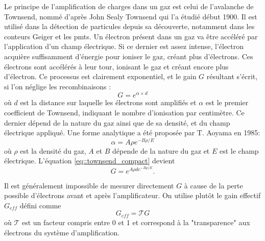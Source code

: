       Le principe de l'amplification de charges dans un gaz est celui de l'avalanche de Townsend, nommé d'après John Sealy Townsend qui l'a étudié début 1900\cite{Townsend1910}. Il est utilisé dans la détection de particules depuis sa découverte, notamment dans les conteurs Geiger et les \glspl{pmt}. Un électron présent dans un gaz va être accéléré par l'application d'un champ électrique. Si ce dernier est assez intense, l'électron acquière suffisamment d'énergie pour ioniser le gaz, créant plus d'électrons. Ces électrons sont accélérés à leur tour, ionisant le gaz et créant encore plus d'électron. Ce processus est clairement exponentiel, et le gain $G$ résultant s'écrit, si l'on néglige les recombinaisons :
      \begin{equation}\label{eq::townsend_compact}
        G = e^{\alpha\times d}
      \end{equation}
      où $d$ est la distance sur laquelle les électrons sont amplifiés et $\alpha$ est le premier coefficient de Townsend, indiquant le nombre d'ionisation par centimètre. Ce dernier dépend de la nature du gaz ainsi que de sa densité, et du champ électrique appliqué. Une forme analytique a été proposée par T. Aoyama en 1985\cite{Aoyama1985}:
      \begin{equation}\label{eq::townsend_coef}
        \alpha = A\rho e^{-B\rho/E}
      \end{equation}
      où $\rho$ est la densité du gaz, $A$ et $B$ dépende de la nature du gaz et $E$ est le champ électrique. L'équation \eqref{eq::townsend_compact} devient
      \begin{equation}\label{eq::townsend}
        G = e^{A\rho  de^{-B\rho /E}}.
      \end{equation}

      Il est généralement impossible de mesurer directement $G$ à cause de la perte possible d'électrons avant et après l'amplificateur. On utilise plutôt le gain effectif $G_{eff}$ défini comme
      \begin{equation}\label{eq::gain_eff}
        G _{eff}= \mathcal{T}G
      \end{equation}
      où $\mathcal{T}$ est un facteur compris entre 0 et 1 et correspond à la "transparence" aux électrons du système d'amplification. 


